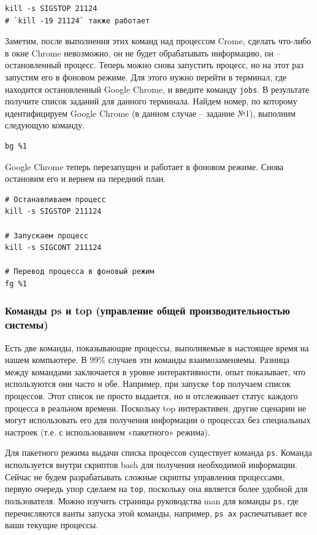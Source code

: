 \documentclass[12pt]{article}
\begin{document}
\begin{verbatim}
kill -s SIGSTOP 21124
# `kill -19 21124` также работает
\end{verbatim}
Заметим, после выполнения этих команд над процессом Crome, сделать что-либо в окне Chrome невозможно, он не
будет обрабатывать информацию, он -- остановленный процесс. Теперь можно снова
запустить процесс, но на этот раз запустим его в фоновом режиме. Для
этого нужно перейти в терминал, где находится остановленный Google
Chrome, и введите команду \texttt{jobs}. В результате получите список
заданий для данного терминала. Найдем номер, по которому идентифицируем
Google Chrome (в данном случае -- задание №1), выполним следующую команду.
\begin{verbatim}
bg %1
\end{verbatim}

Google Chrome теперь перезапущен и работает в фоновом режиме. Снова
остановим его и вернем на передний план.
\begin{verbatim}
# Останавливаем процесс
kill -s SIGSTOP 211124

# Запускаем процесс
kill -s SIGCONT 211124

# Перевод процесса в фоновый режим
fg %1
\end{verbatim}

\hypertarget{ps-and-top-commands-system-performance-management}{%
\subsubsection{\texorpdfstring{\protect\hyperlink{ps-and-top-commands-system-performance-management}{}Команды
ps и top (управление общей производительностью
системы)}{Команды ps и top (управление общей производительностью системы)}}\label{ps-and-top-commands-system-performance-management}}

Есть две команды, показывающие процессы, выполняемые в настоящее время
на нашем компьютере. В 99\% случаев эти команды взаимозаменяемы. Разница
между командами заключается в уровне интерактивности, опыт показывает,
что используются они часто и обе. Например, при запуске \texttt{top}
получаем список процессов. Этот список не просто выдается, но и
отслеживает статус каждого процесса в реальном времени. Поскольку top
интерактивен, другие сценарии не могут использовать его для получения
информации о процессах без специальных настроек (т.е. с использованием
«пакетного» режима).

Для пакетного режима выдачи списка процессов существует команда \texttt{ps}. Команда
используется внутри скриптов bash для получения необходимой информации.
Сейчас не будем разрабатывать сложные скрипты управления
процессами, первую очередь упор сделаем на \texttt{top}, поскольку она
является более удобной для пользователя. Можно изучить страницы
руководства man для команды \texttt{ps}, где перечисляются ванты запуска
этой команды, например, \texttt{ps\ ax} распечатывает все ваши текущие процессы.
\end{document}
